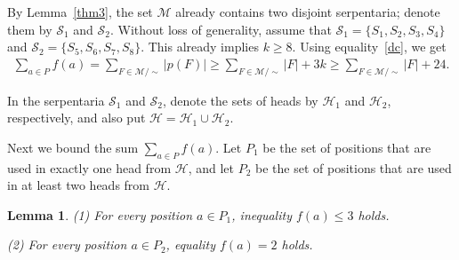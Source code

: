 \documentclass[12pt,a4paper]{article}
\newcommand{\M}{\mathcal{M}}
\newtheorem{lemma}[theorem]{Lemma}
\begin{document}
By Lemma~\ref{thm3}, the set $\M$ already contains two disjoint serpentaria; denote them by $\mathcal S_1$ and $\mathcal S_2$. Without loss of generality, assume that $\mathcal S_1=\{S_1,S_2,S_3,S_4\}$ and $\mathcal S_2=\{S_5,S_6,S_7,S_8\}$. This already implies $k\geqslant 8$. Using equality~\eqref{dc}, we get
    \begin{align}\label{eq4}
        \sum_{a \in P} f(a) = \sum_{F \in \M/\sim}|p(F)| \geqslant \sum_{F \in \M/\sim}|F| + 3k \geqslant \sum_{F \in \M/\sim}|F| + 24.
    \end{align}

In the serpentaria $\mathcal S_1$ and $\mathcal S_2$, denote the sets of heads by $\mathcal H_1$ and $\mathcal H_2$, respectively, and also put $\mathcal H=\mathcal H_1\cup\mathcal H_2$.

Next we bound the sum $\sum_{a\in P}f(a)$. Let $P_1$ be the set of positions that are used in exactly one head from $\mathcal H$, and let $P_2$ be the set of positions that are used in at least two heads from $\mathcal H$.


\begin{lemma}\label{lemserpent}
    (1) For every position $a \in P_1$, inequality $f(a)\leqslant 3$ holds.

    (2) For every position $a \in P_2$, equality $f(a)=2$ holds.
\end{lemma}
\end{document}
